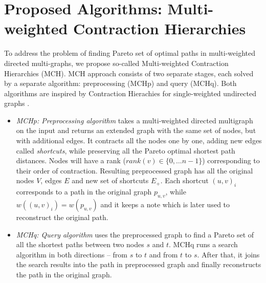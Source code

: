
\section{Proposed Algorithms: Multi-weighted Contraction Hierarchies}
\label{secAlgorithms}

To address the problem of finding Pareto set of optimal paths in multi-weighted directed multi-graphs, we propose so-called Multi-weighted Contraction Hierarchies (MCH). 
MCH approach consists of two separate stages, each solved by a separate algorithm: preprocessing (MCHp) and query (MCHq). 
Both algorithms are inspired by Contraction Hierachies for single-weighted undirected graphs \cite{geisberger2008contraction}.

\begin{itemize}
  \item {\em MCHp: Preprocessing algorithm} takes a multi-weighted directed multigraph on the input and returns an extended graph with the same set of nodes, but with additional edges. It contracts all the nodes one by one, adding new edges called \emph{shortcuts}, while preserving all the Pareto optimal shortest path distances. 
Nodes will have a rank ($rank(v) \in \{0, \dots n-1\}$) corresponding to their order of contraction.
Resulting preprocessed graph has all the original nodes $V$, edges $E$ and new set of shortcuts $E_+$.
Each shortcut $(u,v)_i$ corresponds to a path in the original graph $p_{u,v}$, while $w((u,v)_i) = w(p_{u,v})$ and it keeps a note which is later used to reconstruct the original path.
  \item {\em MCHq: Query algorithm} uses the preprocessed graph to find a Pareto set of all
the shortest paths between two nodes $s$ and $t$. MCHq runs a search algorithm in both directions -- from $s$ to $t$ and from $t$ to $s$. After that, it joins the search results into the path in preprocessed graph and finally reconstructs the path in the original graph. 
\end{itemize}




